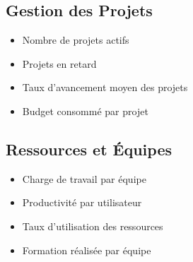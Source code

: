 \documentclass[12pt,a4paper]{article}
\begin{document}
\subsection{Gestion des Projets}
\begin{itemize}
    \item Nombre de projets actifs
    \item Projets en retard
    \item Taux d'avancement moyen des projets
    \item Budget consommé par projet
\end{itemize}

\subsection{Ressources et Équipes}
\begin{itemize}
    \item Charge de travail par équipe
    \item Productivité par utilisateur
    \item Taux d'utilisation des ressources
    \item Formation réalisée par équipe
\end{itemize}
\end{document}
